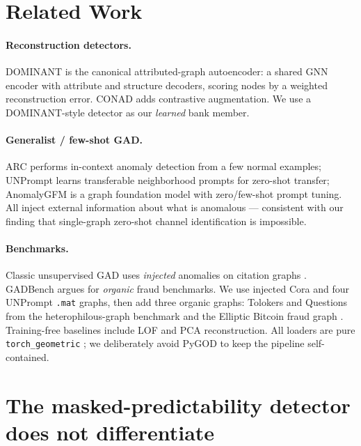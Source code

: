\documentclass[11pt]{article}
\begin{document}
\section{Related Work}
\label{sec:related}

\paragraph{Reconstruction detectors.} DOMINANT \citep{ding2019dominant} is the canonical
attributed-graph autoencoder: a shared GNN encoder with attribute and structure decoders,
scoring nodes by a weighted reconstruction error. CONAD \citep{xu2022conad} adds contrastive
augmentation. We use a DOMINANT-style detector as our \emph{learned} bank member.

\paragraph{Generalist / few-shot GAD.} ARC \citep{liu2024arc} performs in-context anomaly
detection from a few normal examples; UNPrompt \citep{niu2024unprompt} learns transferable
neighborhood prompts for zero-shot transfer; AnomalyGFM \citep{qiao2025anomalygfm} is a graph
foundation model with zero/few-shot prompt tuning. All inject external information about what
is anomalous --- consistent with our finding that single-graph zero-shot channel identification
is impossible.

\paragraph{Benchmarks.} Classic unsupervised GAD uses \emph{injected} anomalies on citation
graphs \citep{ding2019dominant,liu2022bond}. GADBench \citep{tang2023gadbench} argues for
\emph{organic} fraud benchmarks. We use injected Cora \citep{yang2016planetoid} and four
UNPrompt \texttt{.mat} graphs, then add three organic graphs: Tolokers and Questions from the
heterophilous-graph benchmark \citep{platonov2023critical} and the Elliptic Bitcoin fraud
graph \citep{weber2019elliptic}. Training-free baselines include LOF \citep{breunig2000lof}
and PCA reconstruction. All loaders are pure \texttt{torch\_geometric} \citep{fey2019pyg}; we
deliberately avoid PyGOD to keep the pipeline self-contained.

\section{The masked-predictability detector does not differentiate}
\label{sec:poc}
\end{document}
